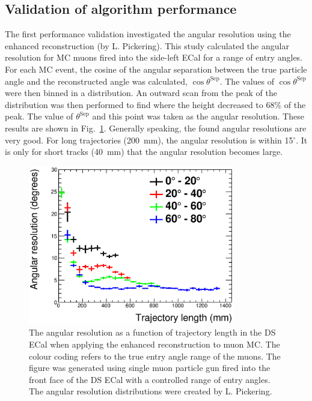 \subsection{Validation of algorithm performance}
\label{subsec:ValidationOfAlgorithmPerformance}
The first performance validation investigated the angular resolution using the enhanced reconstruction (by L. Pickering).  This study calculated the angular resolution for MC muons fired into the side-left ECal for a range of entry angles.  For each MC event, the cosine of the angular separation between the true particle angle and the reconstructed angle was calculated, $\cos\theta^{\textrm{Sep}}$.  The values of $\cos\theta^{\textrm{Sep}}$ were then binned in a distribution.  An outward scan from the peak of the distribution was then performed to find where the height decreased to $68\%$ of the peak.  The value of $\theta^{\textrm{Sep}}$ and this point was taken as the angular resolution.  These results are shown in Fig.~\ref{fig:MuonAngularResolutionDSECal}.  Generally speaking, the found angular resolutions are very good.  For long trajectories (200~mm), the angular resolution is within 15$^\circ$.  It is only for short tracks (40~mm) that the angular resolution becomes large.
\begin{figure}
  \centering
  \includegraphics[width=9cm]{images/hough_validation/MuonAngularResolutionDSECal}
  \caption{The angular resolution as a function of trajectory length in the DS ECal when applying the enhanced reconstruction to muon MC.  The colour coding refers to the true entry angle range of the muons.  The figure was generated using single muon particle gun fired into the front face of the DS ECal with a controlled range of entry angles.  The angular resolution distributions were created by L. Pickering.}
  \label{fig:MuonAngularResolutionDSECal}
\end{figure}
\newline
